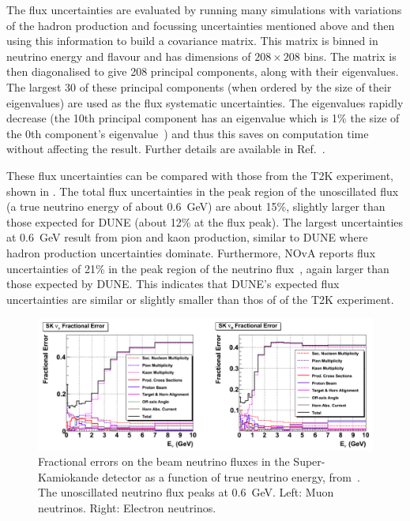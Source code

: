 The flux uncertainties are evaluated by running many simulations with variations of the hadron production and focussing uncertainties mentioned above and then using this information to build a covariance matrix.
This matrix is binned in neutrino energy and flavour and has dimensions of $208 \times 208$ bins.
The matrix is then diagonalised to give 208 principal components, along with their eigenvalues.
The largest 30 of these principal components (when ordered by the size of their eigenvalues) are used as the flux systematic uncertainties.
The eigenvalues rapidly decrease (the 10th principal component has an eigenvalue which is 1\% the size of the 0th component's eigenvalue~\cite{tdrVol2}) and thus this saves on computation time without affecting the result. 
Further details are available in Ref.~\cite{duneFluxUncertainties}.

These flux uncertainties can be compared with those from the T2K experiment, shown in .
The total flux uncertainties in the peak region of the unoscillated flux (a true neutrino energy of about \SI{0.6}{\GeV}) are about 15\%, slightly larger than those expected for DUNE (about 12\% at the flux peak).
The largest uncertainties at \SI{0.6}{\GeV} result from pion and kaon production, similar to DUNE where hadron production uncertainties dominate.
Furthermore, NOvA reports flux uncertainties of 21\% in the peak region of the neutrino flux~\cite{novaFluxUnc}, again larger than those expected by DUNE.
This indicates that DUNE's expected flux uncertainties are similar or slightly smaller than thos of of the T2K experiment.

\begin{figure}[h]
  \centering
  \includegraphics[width=.9\linewidth]{files/figures/dune_lbl/t2kFluxUncertainties}
  \caption[Fractional errors on beam neutrino fluxes in Super-Kamiokande]{Fractional errors on the beam neutrino fluxes in the Super-Kamiokande detector as a function of true neutrino energy, from~\cite{t2kFluxUnc}. The unoscillated neutrino flux peaks at \SI{0.6}{\GeV}. Left: Muon neutrinos. Right: Electron neutrinos.}
  \label{fig:t2kFluxUnc}
\end{figure}


